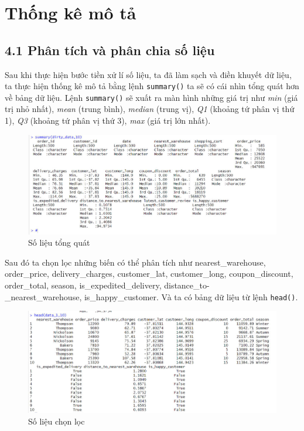 \section{Thống kê mô tả}
\subsection*{4.1 Phân tích và phân chia số liệu}
Sau khi thực hiện bước tiền xử lí số liệu, ta đã làm sạch và điền khuyết dữ liệu, ta thực hiện thống kê mô tả bằng lệnh \texttt{summary()} ta sẽ có cái nhìn tổng quát hơn về bảng dữ liệu. Lệnh \texttt{summary()} sẽ xuất ra màn hình những giá trị như \textit{min} (giá trị nhỏ nhất), \textit{mean} (trung bình), \textit{median} (trung vị), \textit{Q1} (khoảng tứ phân vị thứ 1), \textit{Q3} (khoảng tứ phân vị thứ 3), \textit{max} (giá trị lớn nhất).
\begin{figure}[H]
    \centering
    \includegraphics[width=0.9\linewidth]{graphics/bang1.jpg}
    \caption{Số liệu tổng quát}
    
\end{figure}
Sau đó ta chọn lọc những biến có thể phân tích như nearest\_warehouse, order\_price, delivery\_charges, customer\_lat, customer\_long, coupon\_discount, order\_total, season, is\_expedited\_delivery, distance\_to-\\\_nearest\_warehouse, is\_happy\_customer. Và ta có bảng dữ liệu từ lệnh \texttt{head()}.
\begin{figure}[H]
    \centering
    \includegraphics[width=0.9\linewidth]{graphics/bang2.jpg}
    \caption{Số liệu chọn lọc}
   
\end{figure}
            
